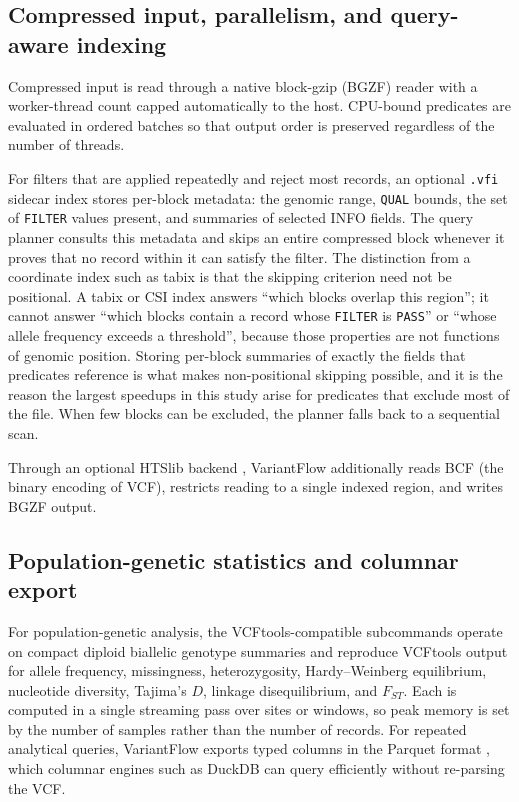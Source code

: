 \subsection{Compressed input, parallelism, and query-aware indexing}

Compressed input is read through a native block-gzip (BGZF) reader with a
worker-thread count capped automatically to the host. CPU-bound predicates are
evaluated in ordered batches so that output order is preserved regardless of the
number of threads.

For filters that are applied repeatedly and reject most records, an optional
\texttt{.vfi} sidecar index stores per-block metadata: the genomic range,
\texttt{QUAL} bounds, the set of \texttt{FILTER} values present, and summaries of
selected INFO fields. The query planner consults this metadata and skips an
entire compressed block whenever it proves that no record within it can satisfy
the filter. The distinction from a coordinate index such as tabix
\citep{tabix} is that the skipping criterion need not be positional. A tabix or
CSI index answers ``which blocks overlap this region''; it cannot answer ``which
blocks contain a record whose \texttt{FILTER} is \texttt{PASS}'' or ``whose
allele frequency exceeds a threshold'', because those properties are not
functions of genomic position. Storing per-block summaries of exactly the fields
that predicates reference is what makes non-positional skipping possible, and it
is the reason the largest speedups in this study arise for predicates that
exclude most of the file. When few blocks can be excluded, the planner falls back
to a sequential scan.

Through an optional HTSlib backend \citep{htslib}, VariantFlow additionally reads
BCF (the binary encoding of VCF), restricts reading to a single indexed region,
and writes BGZF output.

\subsection{Population-genetic statistics and columnar export}

For population-genetic analysis, the VCFtools-compatible subcommands operate on
compact diploid biallelic genotype summaries and reproduce VCFtools output for
allele frequency, missingness, heterozygosity, Hardy--Weinberg equilibrium,
nucleotide diversity, Tajima's $D$, linkage disequilibrium, and $F_{ST}$. Each is
computed in a single streaming pass over sites or windows, so peak memory is set
by the number of samples rather than the number of records. For repeated
analytical queries, VariantFlow exports typed columns in the Parquet format
\citep{parquet}, which columnar engines such as DuckDB \citep{duckdb} can query
efficiently without re-parsing the VCF.

